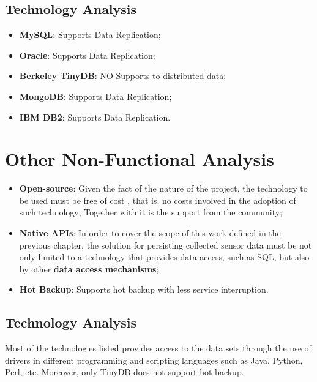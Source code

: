 \subsection{Technology Analysis}

\begin{itemize}
  \item \textbf{MySQL}: Supports Data Replication;
  \item \textbf{Oracle}: Supports Data Replication;
  \item \textbf{Berkeley TinyDB}: NO Supports to distributed data;
  \item \textbf{MongoDB}: Supports Data Replication;
  \item \textbf{IBM DB2}: Supports Data Replication.
\end{itemize}

\section{Other Non-Functional Analysis}

\begin{itemize}
  \item \textbf{Open-source}: Given the fact of the nature of the project, the
  technology to be used must be free of cost \cite{open-source}, that is, no
  costs involved in the adoption of such technology; Together with it is the
  support from the community;
  \item \textbf{Native APIs}: In order to cover the scope of this work defined
  in the previous chapter, the solution for persisting collected sensor data
  must be not only limited to a technology that provides data access, such as
  SQL, but also by other \textbf{data access mechanisms};
  \item \textbf{Hot Backup}: Supports hot backup with less service interruption. 
\end{itemize}

\subsection{Technology Analysis}

Most of the technologies listed provides access to the data sets through the
use of drivers in different programming and scripting languages such as Java,
Python, Perl, etc. Moreover, only TinyDB does not support hot backup.

